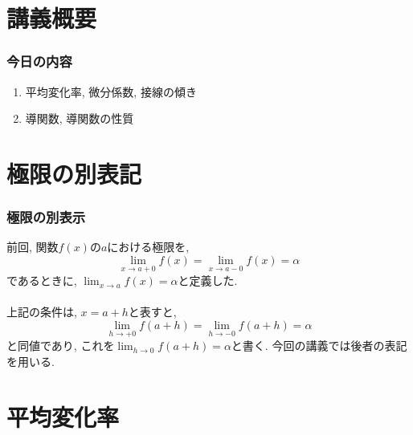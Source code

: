 \section{講義概要}


\begin{frame}
\frametitle{今日の内容}



\begin{enumerate}
\item 平均変化率, 微分係数, 接線の傾き
\item 導関数, 導関数の性質
\end{enumerate} 



\end{frame}






\section{極限の別表記}


\begin{frame}
\frametitle{極限の別表示}


前回, 関数$f(x)$の$a$における極限を,
$$
\lim_{x \to a +0}f(x)=\lim_{x \to a -0}f(x)=\alpha
$$
であるときに, $\displaystyle \lim_{x \to a}f(x)=\alpha$と定義した. \\
\ \\

上記の条件は, $x=a+h$と表すと, 
$$
\lim_{h \to +0}f(a+h)=\lim_{h\to -0}f(a+h)=\alpha
$$
と同値であり, これを$\displaystyle \lim_{h \to 0}f(a+h)=\alpha$と書く. 
今回の講義では後者の表記を用いる. 


\end{frame}




\section{平均変化率}


